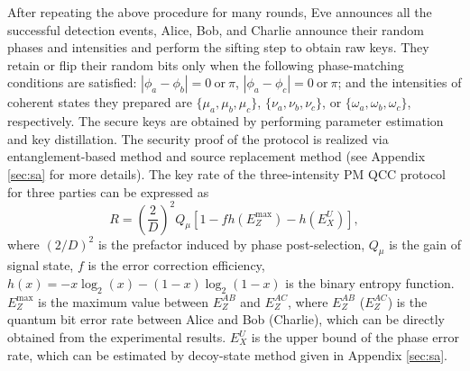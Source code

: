 \documentclass[aps,twocolumn,superscriptaddress,showpacs,nofootinbib]{revtex4-2}
\begin{document}
After repeating the above procedure for many rounds, Eve announces all the successful detection events, Alice, Bob, and Charlie announce their random phases and intensities and perform the sifting step to obtain raw keys. They retain or flip their random bits only when the following phase-matching conditions are satisfied: $|\phi_a-\phi_b|=0~\text{or}~\pi$, $|\phi_a-\phi_c|=0~\text{or}~\pi$; and the intensities of coherent states they prepared are $\{ \mu_a,\mu_b,\mu_c \}$, $ \{ \nu_a,\nu_b,\nu_c \}$, or $\{ \omega_a,\omega_b,\omega_c \}$, respectively. The secure keys are obtained by performing parameter estimation and key distillation. The security proof of the protocol is realized via entanglement-based method \cite{PRAZhao2020} and source replacement method \cite{AQTHuang2024} (see Appendix \ref{sec:sa} for more details). The key rate of the three-intensity PM QCC protocol for three parties can be expressed as
\begin{equation}
R = \left( \frac{2}{D} \right)^2 Q_\mu \left[1-fh(E^\text{max}_Z)-h(E^U_X)\right],
\end{equation}
where $(2/D)^2$ is the prefactor induced by phase post-selection, $Q_{\mu}$ is the gain of signal state, $f$ is the error correction efficiency, $h(x)=-x \log_2(x)-(1-x)\log_2(1-x)$ is the binary entropy function.  $E^\text{max}_Z$ is the maximum value between $E^{AB}_Z$ and $E^{AC}_Z$, where $E^{AB}_Z$  ($E^{AC}_Z$) is the quantum bit error rate between Alice and Bob (Charlie), which can be directly obtained from the experimental results. $E^U_X$ is the upper bound of the phase error rate, which can be estimated by decoy-state method given in Appendix \ref{sec:sa}.
\end{document}
